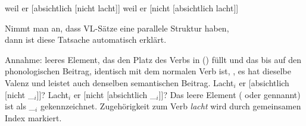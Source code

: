 {{\eal
\ex weil er [absichtlich [nicht lacht]]
\ex weil er [nicht [absichtlich lacht]]
\zl

Nimmt man an, dass VL-Sätze eine parallele Struktur haben,\\
dann ist diese Tatsache automatisch erklärt. 


Annahme: leeres Element, das den Platz des Verbs in () füllt und das bis auf den phonologischen Beitrag,
identisch mit dem normalen Verb ist, \dash, es hat dieselbe Valenz und leistet auch denselben semantischen
Beitrag. 
\eal
\ex Lacht$_i$ er [absichtlich [nicht \_$_i$]]?
\ex Lacht$_i$ er [nicht [absichtlich \_$_i$]]?
\zl
Das leere Element ( oder  gennannt) ist als \_$_i$
gekennzeichnet. Zugehörigkeit zum Verb \emph{lacht} wird durch gemeinsamen
Index markiert.

}




}
